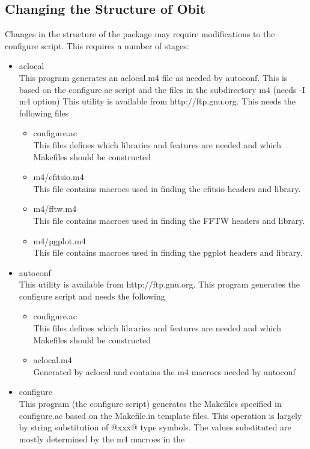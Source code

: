 \documentclass[11pt]{article}
\begin{document}
\subsection{Changing the Structure of Obit}
Changes in the structure of the package may require modifications to
the configure script.
This requires a number of stages:
\begin{itemize}
\item  aclocal \\
This program generates an aclocal.m4 file as needed by autoconf.
This is based on the configure.ac script and the files in the
subdirectory m4 (needs -I m4 option)
This utility is available from http://ftp.gnu.org.
This needs the following files
\begin{itemize}
\item  configure.ac \\
This files defines which libraries and features are needed and which
Makefiles should be constructed
\item  m4/cfitsio.m4\\
This file contains macroes used in finding the cfitsio headers and
library. 
\item   m4/fftw.m4\\
This file contains macroes used in finding the FFTW headers and
library. 
\item   m4/pgplot.m4\\
This file contains macroes used in finding the pgplot headers and
library. 
\end{itemize}
\item  autoconf \\
This utility is available from http://ftp.gnu.org.
This program generates the configure script and needs the following
\begin{itemize}
\item  configure.ac \\
This files defines which libraries and features are needed and which
Makefiles should be constructed
\item  aclocal.m4 \\
Generated by aclocal and contains the m4 macroes needed by autoconf
\end{itemize}
\item  configure \\
This program (the configure script) generates the Makefiles specified
in configure.ac based on the Makefile.in template files. 
This operation is largely by string substitution of @xxx@ type
symbols.
The values substituted are mostly determined by the m4 macroes in the

\end{itemize}
\end{document}
